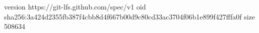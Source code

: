 version https://git-lfs.github.com/spec/v1
oid sha256:3a424d2355fb387f4cbb8d4f667b00d9c80cd33ac3704f06b1e899f427fffa0f
size 508634
